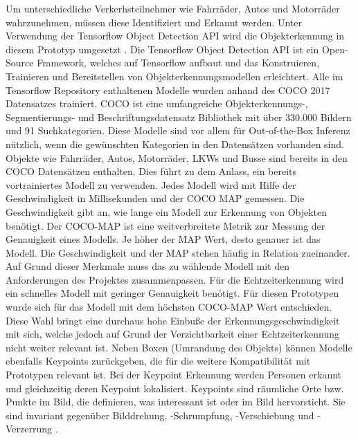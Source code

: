Um unterschiedliche Verkerhsteilnehmer wie Fahrräder, Autos und Motorräder wahrzunehmen, müssen diese Identifiziert und Erkannt werden. Unter Verwendung der Tensorflow Object Detection \ac{API} wird die Objekterkennung in diesem Prototyp umgesetzt \cite{tf_object_detection_github}. Die Tensorflow Object Detection API ist ein Open-Source Framework, welches auf Tensorflow aufbaut und das Konstruieren, Trainieren und Bereitstellen von Objekterkennungsmodellen erleichtert. Alle im Tensorflow Repository enthaltenen Modelle wurden anhand des \ac{COCO} 2017 Datensatzes trainiert. \ac{COCO} ist eine umfangreiche Objekterkennungs-, Segmentierungs- und Beschriftungsdatensatz Bibliothek mit über 330.000 Bildern und 91 Suchkategorien. Diese Modelle sind vor allem für Out-of-the-Box Inferenz nützlich, wenn die gewünschten Kategorien in den Datensätzen vorhanden sind. Objekte wie Fahrräder, Autos, Motorräder, LKWs und Busse sind bereits in den \ac{COCO} Datensätzen enthalten. Dies führt zu dem Anlass, ein bereits vortrainiertes Modell zu verwenden. Jedes Modell wird mit Hilfe der Geschwindigkeit in Millisekunden und der \ac{COCO} \ac{MAP} gemessen. Die Geschwindigkeit gibt an, wie lange ein Modell zur Erkennung von Objekten benötigt. Der \ac{COCO}-\ac{MAP} ist eine weitverbreitete Metrik zur Messung der Genauigkeit eines Modells. Je höher der \ac{MAP} Wert, desto genauer ist das Modell. Die Geschwindigkeit und der \ac{MAP} stehen häufig in Relation zueinander. %
Auf Grund dieser Merkmale muss das zu wählende Modell mit den Anforderungen des Projektes zusammenpassen. Für die Echtzeiterkennung wird ein schnelles Modell mit geringer Genauigkeit benötigt. Für diesen Prototypen wurde sich für das Modell mit dem höchsten \ac{COCO}-\ac{MAP} Wert entschieden. Diese Wahl bringt eine durchaus hohe Einbuße der Erkennungsgeschwindigkeit mit sich, welche jedoch auf Grund der Verzichtbarkeit einer Echtzeiterkennung nicht weiter relevant ist. Neben Boxen (Umrandung des Objekts) können Modelle ebenfalls Keypoints zurückgeben, die für die weitere Kompatibilität mit Prototypen relevant ist. Bei der Keypoint Erkennung werden Personen erkannt und gleichzeitig deren Keypoint lokalisiert. Keypoints sind räumliche Orte bzw. Punkte im Bild, die definieren, was interessant ist oder im Bild hervorsticht. Sie sind invariant gegenüber Bilddrehung, -Schrumpfung, -Verschiebung und -Verzerrung \cite{kp_detection}.


